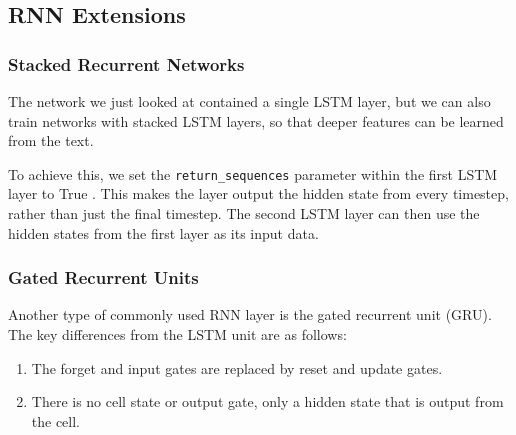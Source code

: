 \documentclass[french]{article}
\begin{document}
\subsection{RNN Extensions}

\subsubsection{Stacked Recurrent Networks}

The network we just looked at contained a single LSTM layer, but we can also train networks with stacked LSTM layers, so that deeper features can be learned from the text.

To achieve this, we set the \verb|return_sequences| parameter within the first LSTM layer to True . This makes the layer output the hidden state from every timestep, rather than just the final timestep. The second LSTM layer can then use the hidden states from the first layer as its input data.

\subsubsection{Gated Recurrent Units}

Another type of commonly used RNN layer is the gated recurrent unit (GRU). The key differences from the LSTM unit are as follows:
\begin{enumerate}
    \item The forget and input gates are replaced by reset and update gates.
    \item There is no cell state or output gate, only a hidden state that is output from the cell.
\end{enumerate}
\end{document}
